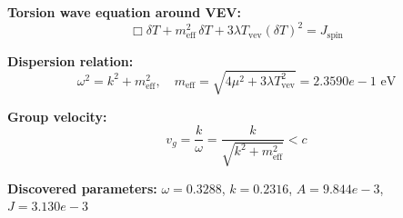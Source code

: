 
\textbf{Torsion wave equation around VEV:}
\begin{equation}
  \Box \delta T + m_{\text{eff}}^2 \, \delta T + 3\lambda T_{\text{vev}} (\delta T)^2 = J_{\text{spin}}
\end{equation}

\textbf{Dispersion relation:}
\begin{equation}
  \omega^2 = k^2 + m_{\text{eff}}^2, \quad
  m_{\text{eff}} = \sqrt{4\mu^2 + 3\lambda T_{\text{vev}}^2} = 2.3590e-1 \text{ eV}
\end{equation}

\textbf{Group velocity:}
\begin{equation}
  v_g = \frac{k}{\omega} = \frac{k}{\sqrt{k^2 + m_{\text{eff}}^2}} < c
\end{equation}

\textbf{Discovered parameters:}
$\omega = 0.3288$, \quad
$k = 0.2316$, \quad
$A = 9.844e-3$, \quad
$J = 3.130e-3$